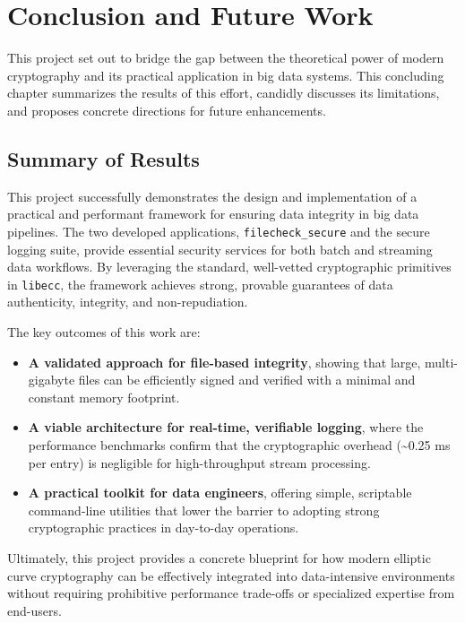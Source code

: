 \chapter{Conclusion and Future Work}
This project set out to bridge the gap between the theoretical power of modern cryptography and its practical application in big data systems. This concluding chapter summarizes the results of this effort, candidly discusses its limitations, and proposes concrete directions for future enhancements.

\section{Summary of Results}
This project successfully demonstrates the design and implementation of a practical and performant framework for ensuring data integrity in big data pipelines. The two developed applications, \texttt{filecheck\_secure} and the secure logging suite, provide essential security services for both batch and streaming data workflows. By leveraging the standard, well-vetted cryptographic primitives in \texttt{libecc}, the framework achieves strong, provable guarantees of data authenticity, integrity, and non-repudiation.

The key outcomes of this work are:
\begin{itemize}
	\item \textbf{A validated approach for file-based integrity}, showing that large, multi-gigabyte files can be efficiently signed and verified with a minimal and constant memory footprint.
	\item \textbf{A viable architecture for real-time, verifiable logging}, where the performance benchmarks confirm that the cryptographic overhead (\textasciitilde 0.25 ms per entry) is negligible for high-throughput stream processing.
	\item \textbf{A practical toolkit for data engineers}, offering simple, scriptable command-line utilities that lower the barrier to adopting strong cryptographic practices in day-to-day operations.
\end{itemize}
Ultimately, this project provides a concrete blueprint for how modern elliptic curve cryptography can be effectively integrated into data-intensive environments without requiring prohibitive performance trade-offs or specialized expertise from end-users.

